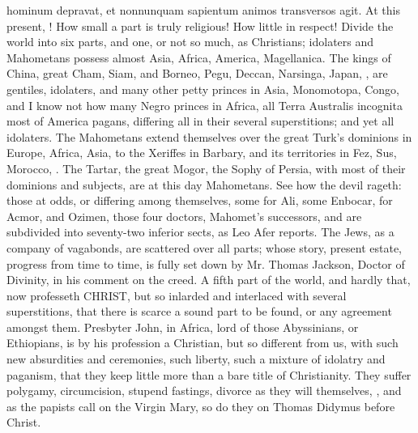 {{hominum depravat, et nonnunquam sapientum animos transversos agit}. At
this present, ! How small a part is truly religious! How
little in respect! Divide the world into six parts, and one, or not so
much, as Christians; idolaters and Mahometans possess almost Asia,
Africa, America, Magellanica. The kings of China, great Cham, Siam, and
Borneo, Pegu, Deccan, Narsinga, Japan, \etc{}, are gentiles, idolaters,
and many other petty princes in Asia, Monomotopa, Congo, and I know not
how many Negro princes in Africa, all Terra Australis incognita most of
America pagans, differing all in their several superstitions; and yet
all idolaters. The Mahometans extend themselves over the great Turk's
dominions in Europe, Africa, Asia, to the Xeriffes in Barbary, and its
territories in Fez, Sus, Morocco, \etc{}. The Tartar, the great Mogor, the
Sophy of Persia, with most of their dominions and subjects, are at this
day Mahometans. See how the devil rageth: those at odds, or differing
among themselves, some for Ali, some Enbocar, for Acmor, and
Ozimen, those four doctors, Mahomet's successors, and are subdivided
into seventy-two inferior sects, as Leo Afer reports. The Jews,
as a company of vagabonds, are scattered over all parts; whose story,
present estate, progress from time to time, is fully set down by
Mr. Thomas Jackson, Doctor of Divinity, in his comment on the
creed. A fifth part of the world, and hardly that, now professeth
\textsc{CHRIST}, but so inlarded and interlaced with several superstitions, that
there is scarce a sound part to be found, or any agreement amongst
them. Presbyter John, in Africa, lord of those Abyssinians, or
Ethiopians, is by his profession a Christian, but so different from us,
with such new absurdities and ceremonies, such liberty, such a mixture
of idolatry and paganism, that they keep little more than a bare
title of Christianity. They suffer polygamy, circumcision, stupend
fastings, divorce as they will themselves, \etc{}, and as the papists call
on the Virgin Mary, so do they on Thomas Didymus before Christ.

}
